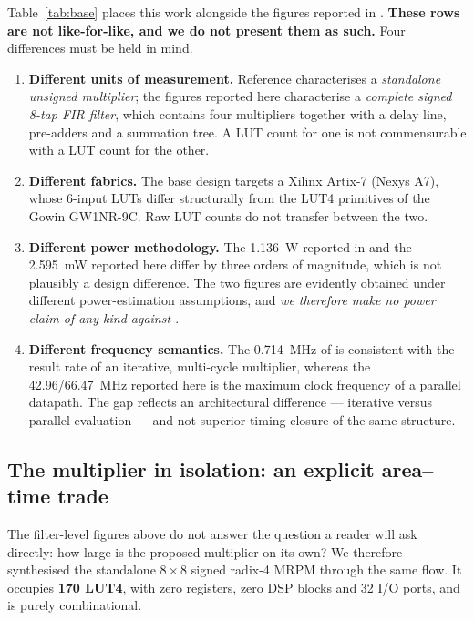 \documentclass[conference]{IEEEtran}
\begin{document}
Table~\ref{tab:base} places this work alongside the figures reported in
\cite{base}. \textbf{These rows are not like-for-like, and we do not
present them as such.} Four differences must be held in mind.

\begin{enumerate}
  \item \textbf{Different units of measurement.} Reference \cite{base}
  characterises a \emph{standalone unsigned multiplier}; the figures
  reported here characterise a \emph{complete signed 8-tap FIR filter},
  which contains four multipliers together with a delay line,
  pre-adders and a summation tree. A LUT count for one is not
  commensurable with a LUT count for the other.

  \item \textbf{Different fabrics.} The base design targets a Xilinx
  Artix-7 (Nexys A7), whose 6-input LUTs differ structurally from the
  LUT4 primitives of the Gowin GW1NR-9C. Raw LUT counts do not transfer
  between the two.

  \item \textbf{Different power methodology.} The 1.136~W reported in
  \cite{base} and the 2.595~mW reported here differ by three orders of
  magnitude, which is not plausibly a design difference. The two figures
  are evidently obtained under different power-estimation assumptions,
  and \emph{we therefore make no power claim of any kind against
  \cite{base}}.

  \item \textbf{Different frequency semantics.} The 0.714~MHz of
  \cite{base} is consistent with the result rate of an iterative,
  multi-cycle multiplier, whereas the 42.96/66.47~MHz reported here is
  the maximum clock frequency of a parallel datapath. The gap reflects
  an architectural difference --- iterative versus parallel evaluation
  --- and not superior timing closure of the same structure.
\end{enumerate}

\subsection{The multiplier in isolation: an explicit area--time trade}
\label{subsec:standalone}

The filter-level figures above do not answer the question a reader will
ask directly: how large is the proposed multiplier on its own? We
therefore synthesised the standalone $8 \times 8$ signed radix-4 MRPM
through the same flow. It occupies \textbf{170 LUT4}, with zero
registers, zero DSP blocks and 32 I/O ports, and is purely
combinational.
\end{document}
